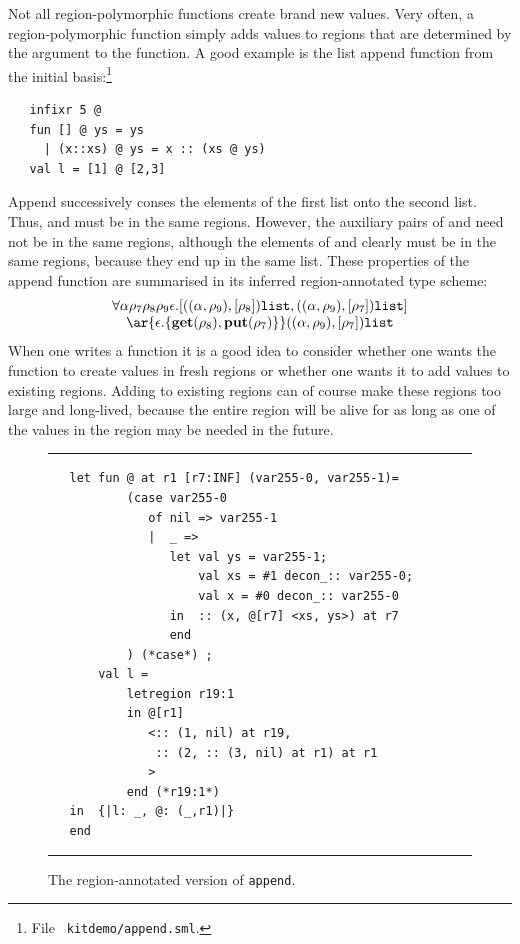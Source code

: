 \documentclass[12pt]{book}
\begin{document}
Not all region-polymorphic functions create brand new values. Very
often, a region-polymorphic function simply adds values to regions
that are determined by the argument to the function. A good example is
the list append function from the initial basis:\footnote{File {\tt
    kitdemo/append.sml}.}
\begin{verbatim}
   infixr 5 @
   fun [] @ ys = ys
     | (x::xs) @ ys = x :: (xs @ ys)
   val l = [1] @ [2,3]
\end{verbatim}
Append successively conses the elements of the first list onto the
second list.  Thus,  and  must be in the same
regions. However, the auxiliary pairs of  and 
need not be in the same regions, although the elements of 
and  clearly must be in the same regions, because they end
up in the same list. These properties of the append function 
are summarised in its inferred region-annotated type scheme:
$$\begin{array}{c}\forall\alpha\rho_7\rho_8\rho_9\epsilon.
   [ ((\alpha,\rho_9),[\rho_8])\boxml{list},
      ((\alpha,\rho_9),[\rho_7])\boxml{list} ] \\
\ar{\epsilon.\{\Get(\rho_8),\Put(\rho_7)\}} ((\alpha,\rho_9),[\rho_7])\boxml{list}\end{array}
$$
When one writes a function it is a good idea to consider whether one
wants the function to create values in fresh regions or whether one
wants it to add values to existing regions.  Adding to existing
regions can of course make these regions too large and long-lived,
because the entire region will be alive for as long as one of the
values in the region may be needed in the future. 

\begin{figure}
\hrule
\medskip
\begin{verbatim}
   let fun @ at r1 [r7:INF] (var255-0, var255-1)= 
           (case var255-0 
              of nil => var255-1
              |  _ => 
                 let val ys = var255-1; 
                     val xs = #1 decon_:: var255-0; 
                     val x = #0 decon_:: var255-0
                 in  :: (x, @[r7] <xs, ys>) at r7
                 end 
           ) (*case*) ; 
       val l = 
           letregion r19:1 
           in @[r1] 
              <:: (1, nil) at r19, 
               :: (2, :: (3, nil) at r1) at r1
              > 
           end (*r19:1*)
   in  {|l: _, @: (_,r1)|}
   end 
\end{verbatim}
\caption{The region-annotated version of {\tt append}.}  
\medskip
\hrule
\label{append.fig}
\end{figure}
\end{document}
